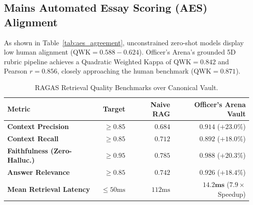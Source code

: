 \documentclass[conference]{IEEEtran}
\begin{document}
\subsection{Mains Automated Essay Scoring (AES) Alignment}
As shown in Table~\ref{tab:aes_agreement}, unconstrained zero-shot models display low human alignment ($\text{QWK} = 0.588 - 0.624$). Officer's Arena's grounded 5D rubric pipeline achieves a Quadratic Weighted Kappa of $\text{QWK} = 0.842$ and Pearson $r = 0.856$, closely approaching the human benchmark ($\text{QWK} = 0.871$).

\begin{table}[h]
\centering
\caption{RAGAS Retrieval Quality Benchmarks over Canonical Vault.}
\label{tab:ragas_benchmarks}
\small
\begin{tabularx}{\columnwidth}{lrrr}
\toprule
\textbf{Metric} & \textbf{Target} & \textbf{Naive RAG} & \textbf{Officer's Arena Vault} \\
\midrule
\textbf{Context Precision} & $\ge 0.85$ & $0.684$ & $\mathbf{0.914}$ ($+23.0\%$) \\
\textbf{Context Recall} & $\ge 0.85$ & $0.712$ & $\mathbf{0.892}$ ($+18.0\%$) \\
\textbf{Faithfulness (Zero-Halluc.)} & $\ge 0.95$ & $0.785$ & $\mathbf{0.988}$ ($+20.3\%$) \\
\textbf{Answer Relevance} & $\ge 0.85$ & $0.742$ & $\mathbf{0.926}$ ($+18.4\%$) \\
\textbf{Mean Retrieval Latency} & $\le 50\text{ms}$ & $112\text{ms}$ & $\mathbf{14.2\text{ms}}$ ($7.9\times$ Speedup) \\
\bottomrule
\end{tabularx}
\end{table}
\end{document}
